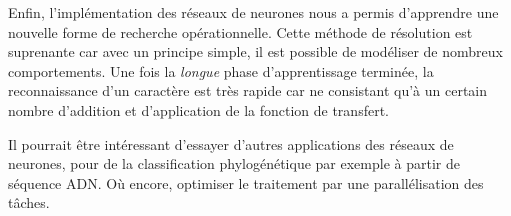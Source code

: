 \documentclass[11pt,a4paper]{report}
\begin{document}
Enfin, l'implémentation des réseaux de neurones nous a permis d'apprendre une nouvelle forme de recherche opérationnelle. Cette méthode de résolution est suprenante car avec un principe simple, il est possible de modéliser de nombreux comportements. Une fois la \textit{longue} phase d'apprentissage terminée, la reconnaissance d'un caractère est très rapide car ne consistant qu'à un certain nombre d'addition et d'application de la fonction de transfert.

Il pourrait être intéressant d'essayer d'autres applications des réseaux de neurones, pour de la classification phylogénétique par exemple à partir de séquence ADN. Où encore, optimiser le traitement par une parallélisation des tâches.
\end{document}
